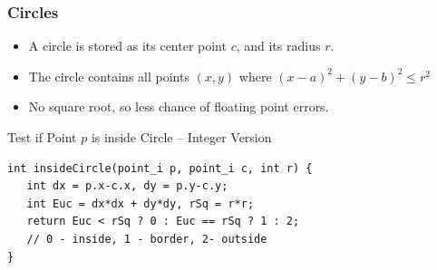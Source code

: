 \begin{frame}[fragile]
  \frametitle{Circles}
  \begin{itemize}
  \item A circle is stored as its center point $c$, and its radius $r$.\medskip

  \item The circle contains all points $(x,y)$ where $(x-a)^2+(y-b)^2 \leq r^2$\medskip

  \item No square root, so less chance of floating point errors.
  \end{itemize}\bigskip

  \begin{exampleblock}{Test if Point $p$ is inside Circle -- Integer Version}
    {\smaller
\begin{verbatim}
int insideCircle(point_i p, point_i c, int r) {
   int dx = p.x-c.x, dy = p.y-c.y;
   int Euc = dx*dx + dy*dy, rSq = r*r;
   return Euc < rSq ? 0 : Euc == rSq ? 1 : 2;
   // 0 - inside, 1 - border, 2- outside
}
\end{verbatim}
}
  \end{exampleblock}
\end{frame}


%
%
%


